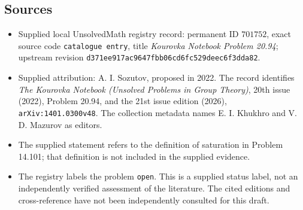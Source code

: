 \documentclass[11pt]{article}
\begin{document}
\subsection{Sources}
\begin{itemize}
\item Supplied local UnsolvedMath registry record: permanent ID \(701752\), exact source code \texttt{catalogue entry}, title \emph{Kourovka Notebook Problem 20.94}; upstream revision \texttt{d371ee917ac9647fbb06cd6fc529deec6f3dda82}.
\item Supplied attribution: A. I. Sozutov, proposed in 2022. The record identifies \emph{The Kourovka Notebook (Unsolved Problems in Group Theory)}, 20th issue (2022), Problem 20.94, and the 21st issue edition (2026), \texttt{arXiv:1401.0300v48}. The collection metadata names E. I. Khukhro and V. D. Mazurov as editors.
\item The supplied statement refers to the definition of saturation in Problem 14.101; that definition is not included in the supplied evidence.
\item The registry labels the problem \texttt{open}. This is a supplied status label, not an independently verified assessment of the literature. The cited editions and cross-reference have not been independently consulted for this draft.
\end{itemize}
\end{document}
